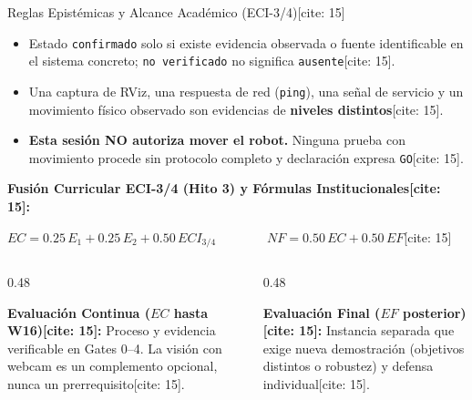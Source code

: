 \documentclass[aspectratio=169, xcolor={table,xcdraw}]{beamer}
\begin{document}
\begin{frame}{Reglas Epistémicas y Alcance Académico (ECI-3/4)[cite: 15]}
    \begin{tcolorbox}[colback=red!5, colframe=red!70!black, title=Reglas Epistémicas para Toda la Sesión {[cite: 15]}, boxsep=1mm, top=1mm, bottom=1mm]
        \footnotesize\raggedright
        \begin{itemize}
            \item Estado \texttt{confirmado} solo si existe evidencia observada o fuente identificable en el sistema concreto; \texttt{no verificado} no significa \texttt{ausente}[cite: 15].
            \item Una captura de RViz, una respuesta de red (\texttt{ping}), una señal de servicio y un movimiento físico observado son evidencias de \textbf{niveles distintos}[cite: 15].
            \item \textbf{Esta sesión NO autoriza mover el robot.} Ninguna prueba con movimiento procede sin protocolo completo y declaración expresa \texttt{GO}[cite: 15].
        \end{itemize}
    \end{tcolorbox}

    \vspace{0.15cm}
    \footnotesize
    \textbf{Fusión Curricular ECI-3/4 (Hito 3) y Fórmulas Institucionales[cite: 15]:}
    \begin{center}
        $\displaystyle \boxed{ EC = 0.25\,E_1 + 0.25\,E_2 + 0.50\,ECI_{3/4} } \qquad\qquad \boxed{ NF = 0.50\,EC + 0.50\,EF }$[cite: 15]
    \end{center}

    \begin{columns}[T]
        \begin{column}{0.48\textwidth}
            \footnotesize\raggedright
            \textbf{Evaluación Continua ($EC$ hasta W16)[cite: 15]:} Proceso y evidencia verificable en Gates 0–4. La visión con webcam es un complemento opcional, nunca un prerrequisito[cite: 15].
        \end{column}
        \begin{column}{0.48\textwidth}
            \footnotesize\raggedright
            \textbf{Evaluación Final ($EF$ posterior)[cite: 15]:} Instancia separada que exige nueva demostración (objetivos distintos o robustez) y defensa individual[cite: 15].
        \end{column}
    \end{columns}
\end{frame}
\end{document}
